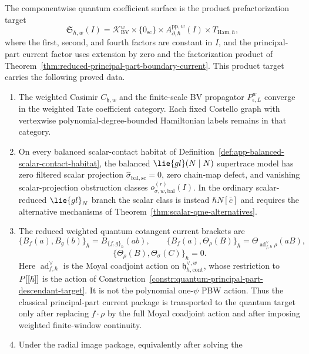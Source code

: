 \documentclass[11pt]{memoir}
\begin{document}
\begin{thm}
  The componentwise quantum coefficient surface is the product
  prefactorization target
  \[
    \mathfrak S_{\hbar,w}(I)
      =
      \mathcal K_{\mathrm{BV}}^w
      \times\{0_{\mathrm{sc}}\}
      \times A^{\mathrm{pp},w}_{\partial,\hbar}(I)
      \times T_{\mathrm{Ham},\hbar},
  \]
  where the first, second, and fourth factors are constant in \(I\), and
  the principal-part current factor uses extension by zero and the
  factorization product of
  Theorem~\ref{thm:reduced-principal-part-boundary-current}.
  This product target carries the following proved data.
  \begin{enumerate}
    \item The weighted Casimir \(C_{\mathfrak h,w}\) and the finite-scale
      BV propagator \(P_{\epsilon,L}^w\) converge in the weighted Tate
      coefficient category.  Each fixed Costello graph with
      vertexwise polynomial-degree-bounded Hamiltonian labels remains in
      that category.
    \item On every balanced scalar-contact habitat of
      Definition~\ref{def:app-balanced-scalar-contact-habitat}, the
      balanced \(\lie{gl}(N\mid N)\) supertrace model has zero filtered
      scalar projection
      \(\widehat\sigma_{\mathrm{bal,sc}}=0\), zero chain-map defect, and
      vanishing scalar-projection obstruction classes
      \(o_{\sigma,w,\mathrm{bal}}^{(r)}(I)\).  In the ordinary
      scalar-reduced \(\lie{gl}_N\) branch the scalar class is instead
      \(\hbar N[\bar c]\) and requires the alternative mechanisms of
      Theorem~\ref{thm:scalar-qme-alternatives}.
    \item The reduced weighted quantum cotangent current brackets are
      \[
        \{B_f(a),B_g(b)\}_\hbar
          =B_{\{f,g\}_\hbar}(ab),\qquad
        \{B_f(a),\Theta_\rho(B)\}_\hbar
          =\Theta_{\operatorname{ad}^{\vee}_{f,\hbar}\rho}(aB),
      \]
      \[
        \{\Theta_\rho(B),\Theta_\sigma(C)\}_\hbar=0 .
      \]
      Here \(\operatorname{ad}^{\vee}_{f,\hbar}\) is the Moyal coadjoint
      action on \(\mathfrak h^{\vee,w}_{\hbar,\mathrm{cont}}\), whose
      restriction to \(P[[\hbar]]\) is the action of
      Construction~\ref{constr:quantum-principal-part-descendant-target}.
      It is not the polynomial one-\(\psi\) PBW action.  Thus the
      classical principal-part current package is transported to the
      quantum target only after replacing \(f\cdot\rho\) by the full
      Moyal coadjoint action and after imposing weighted finite-window
      continuity.
    \item Under the radial image package, equivalently after solving the

\end{enumerate}
\end{thm}
\end{document}
